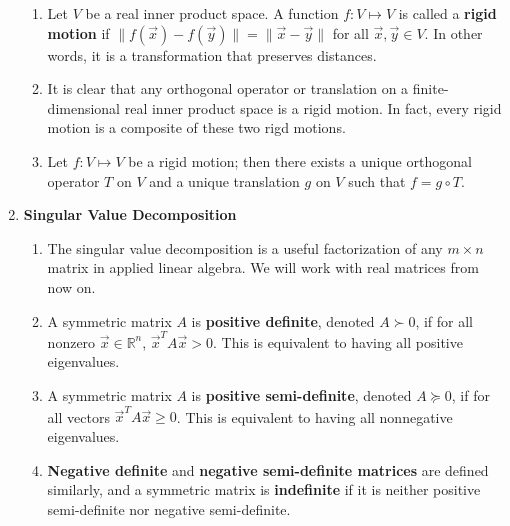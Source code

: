 \documentclass[10pt]{article}
\begin{document}
\begin{multicols*}{2}
\begin{enumerate}
\begin{enumerate}
        \item Let $V$ be a real inner product space. A function $f: V \mapsto V$ is called a \textbf{rigid motion} if $\| f(\vec{x}) - f(\vec{y}) \| = \| \vec{x} - \vec{y} \|$ for all $\vec{x}, \vec{y} \in V$. In other words, it is a transformation that preserves distances.
        \item It is clear that any orthogonal operator or translation on a finite-dimensional real inner product space is a rigid motion. In fact, every rigid motion is a composite of these two rigd motions. 
        \item Let $f: V \mapsto V$ be a rigid motion; then there exists a unique orthogonal operator $T$ on $V$ and a unique translation $g$ on $V$ such that $f = g \circ T$. 
    \end{enumerate}
    \columnbreak
    
    \item \textbf{Singular Value Decomposition}
    \begin{enumerate}
        \item The singular value decomposition is a useful factorization of any $m \times n$ matrix in applied linear algebra. We will work with real matrices from now on.
        
        \item A symmetric matrix $A$ is \textbf{positive definite}, denoted $A \succ 0$, if for all nonzero $\vec{x} \in \mathbb{R}^n$, $\vec{x}^T A \vec{x} > 0$. This is equivalent to having all positive eigenvalues.
        
        \item A symmetric matrix $A$ is \textbf{positive semi-definite}, denoted $A \succeq 0$, if for all vectors $\vec{x}^T A \vec{x} \geq 0$. This is equivalent to having all nonnegative eigenvalues.
        
        \item \textbf{Negative definite} and \textbf{negative semi-definite matrices} are defined similarly, and a symmetric matrix is \textbf{indefinite} if it is neither positive semi-definite nor negative semi-definite.


\end{enumerate}
\end{enumerate}
\end{multicols*}
\end{document}
